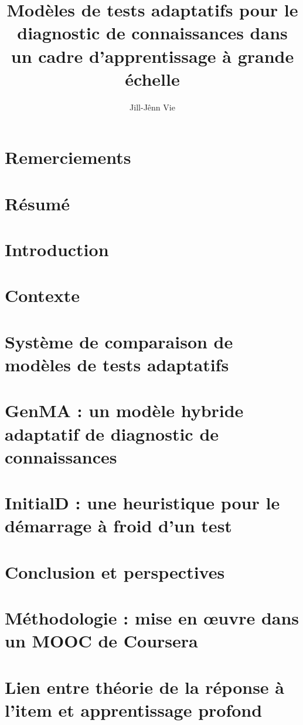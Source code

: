 \documentclass[a4paper,12pt]{memoir}
\title{Modèles de tests adaptatifs pour le diagnostic de connaissances dans un cadre d'apprentissage à grande échelle}
\author{Jill-Jênn Vie}
\begin{document}
\maketitle

\chapter*{Remerciements}


\printnomenclature

\chapter*{Résumé}


\clearpage
\tableofcontents*

\chapter{Introduction}


\chapter{Contexte}


\chapter{Système de comparaison de modèles de tests adaptatifs}



\chapter{GenMA : un modèle hybride adaptatif de diagnostic de connaissances}




\chapter{InitialD : une heuristique pour le démarrage à froid d'un test}




\chapter{Conclusion et perspectives}


\appendix

\chapter{Méthodologie : mise en œuvre dans un MOOC de Coursera}



\chapter{Lien entre théorie de la réponse à l'item et apprentissage profond}


\nocite{*}
\printbibliography
\end{document}
